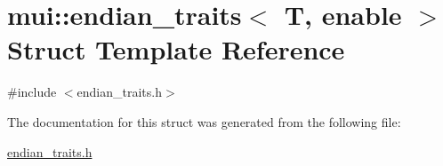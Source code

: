 \hypertarget{structmui_1_1endian__traits}{}\section{mui\+:\+:endian\+\_\+traits$<$ T, enable $>$ Struct Template Reference}
\label{structmui_1_1endian__traits}


{\ttfamily \#include $<$endian\+\_\+traits.\+h$>$}



The documentation for this struct was generated from the following file\+:\begin{DoxyCompactItemize}
\item 
\hyperlink{endian__traits_8h}{endian\+\_\+traits.\+h}\end{DoxyCompactItemize}
